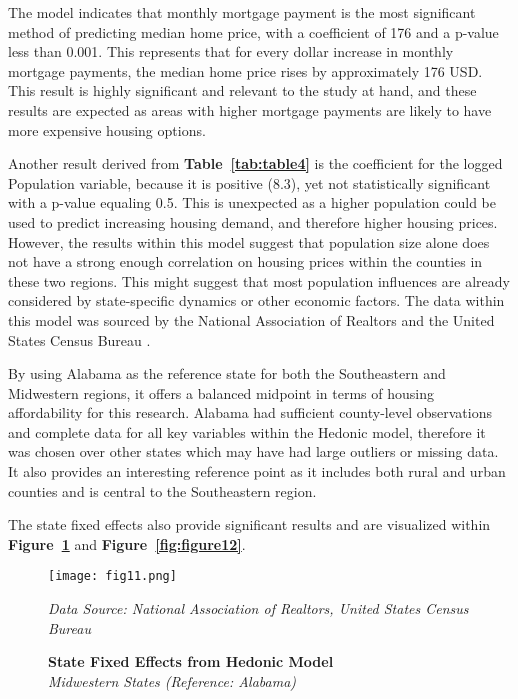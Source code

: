 \documentclass[journal,article,submit,pdftex,moreauthors]{Definitions/mdpi}
\begin{document}
The model indicates that monthly mortgage payment is the most significant method of predicting median home price, with a coefficient of 176 and a p-value less than 0.001. This represents that for every dollar increase in monthly mortgage payments, the median home price rises by approximately 176 USD. This result is highly significant and relevant to the study at hand, and these results are expected as areas with higher mortgage payments are likely to have more expensive housing options.

Another result derived from \textbf{Table~\ref{tab:table4}} is the coefficient for the logged Population variable, because it is positive (8.3), yet not statistically significant with a p-value equaling 0.5. This is unexpected as a higher population could be used to predict increasing housing demand, and therefore higher housing prices. However, the results within this model suggest that population size alone does not have a strong enough correlation on housing prices within the counties in these two regions. This might suggest that most population influences are already considered by state-specific dynamics or other economic factors. The data within this model was sourced by the National Association of Realtors and the United States Census Bureau \citep{_2024_county, _2023_county}.
 
By using Alabama as the reference state for both the Southeastern and Midwestern regions, it offers a balanced midpoint in terms of housing affordability for this research. Alabama had sufficient county-level observations and complete data for all key variables within the Hedonic model, therefore it was chosen over other states which may have had large outliers or missing data. It also provides an interesting reference point as it includes both rural and urban counties and is central to the Southeastern region.

The state fixed effects also provide significant results and are visualized within \textbf{Figure~\ref{fig:figure11}} and \textbf{Figure~\ref{fig:figure12}}. 

\begin{figure}[H]
  \centering
  \texttt{[image: fig11.png]}
  \caption{\textbf{State Fixed Effects from Hedonic Model}\\\textit{Midwestern States (Reference: Alabama)}}
  \label{fig:figure11}
  \vspace{1ex}
  {\footnotesize\textit{Data Source: National Association of Realtors, United States Census Bureau}}
\end{figure}
\end{document}
